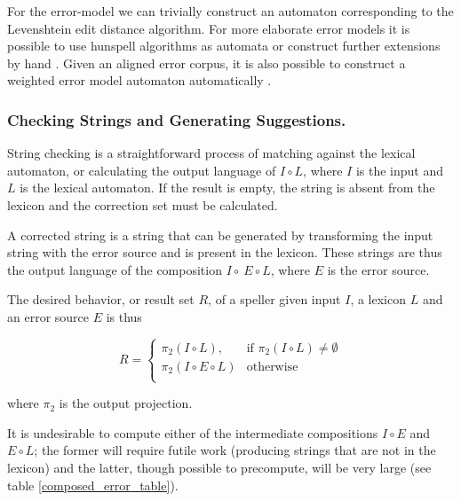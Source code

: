 \documentclass{llncs}
\begin{document}
For the error-model we can trivially construct an automaton corresponding to
the Levenshtein edit distance algorithm\cite{oflazer/1996,agata/2002}. For more elaborate error models
it is possible to use hunspell algorithms as automata \cite{pirinen/2010/il} or
construct further extensions by hand \cite{pirinen/2010/lrec}. Given an
aligned error corpus, it is also possible to construct a weighted error model
automaton automatically \cite{brill/2000}.

\subsubsection{Checking Strings and Generating Suggestions.}

String checking is a straightforward process of matching against the lexical
automaton, or calculating the output language of $I \circ L$, where $I$ is the
input and $L$ is the lexical automaton. If the result is empty, the
string is absent from the lexicon and the correction set must be calculated.

A corrected string is a string that can be generated by transforming the
input string with the error source and is present in the lexicon.
These strings are thus the output language of the composition
$I \circ \ E \circ L$, where $E$ is the error source.

The desired behavior, or result set $R$, of a speller given input $I$, a
lexicon $L$ and an error source $E$ is thus

\begin{equation*}R = \begin{cases}
    \pi_2(I \circ L), & \mbox{if } \pi_2(I \circ L) \neq \emptyset \\
    \pi_2(I \circ E \circ L) & \mbox{otherwise}\\
  \end{cases}
\end{equation*}

where $\pi_2$ is the output projection.

It is undesirable to compute either of the intermediate compositions
$I \circ E$ and $E \circ L$; the former will require futile work (producing
strings that are not in the lexicon) and the latter, though possible to
precompute, will be very large (see table \ref{composed_error_table}).
\end{document}
